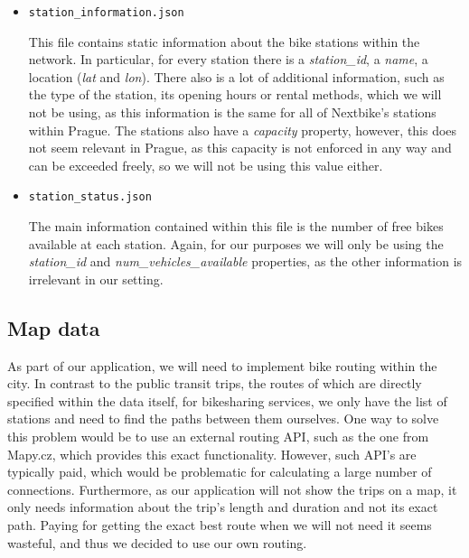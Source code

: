 \begin{itemize}
    \item \texttt{station\_information.json}

    This file contains static information about the bike stations within the network. In particular, for every station there is a \textit{station\_id}, a \textit{name}, a location (\textit{lat} and \textit{lon}). There also is a lot of additional information, such as the type of the station, its opening hours or rental methods, which we will not be using, as this information is the same for all of Nextbike's stations within Prague. The stations also have a \textit{capacity} property, however, this does not seem relevant in Prague, as this capacity is not enforced in any way and can be exceeded freely, so we will not be using this value either.

    \item \texttt{station\_status.json}

    The main information contained within this file is the number of free bikes available at each station. Again, for our purposes we will only be using the \textit{station\_id} and \textit{num\_vehicles\_available} properties, as the other information is irrelevant in our setting.
\end{itemize}



\subsection{Map data}

As part of our application, we will need to implement bike routing within the city. In contrast to the public transit trips, the routes of which are directly specified within the data itself, for bikesharing services, we only have the list of stations and need to find the paths between them ourselves. One way to solve this problem would be to use an external routing API, such as the one from Mapy.cz, which provides this exact functionality\cite{mapyczapi}. However, such API's are typically paid, which would be problematic for calculating a large number of connections. Furthermore, as our application will not show the trips on a map, it only needs information about the trip's length and duration and not its exact path. Paying for getting the exact best route when we will not need it seems wasteful, and thus we decided to use our own routing.

